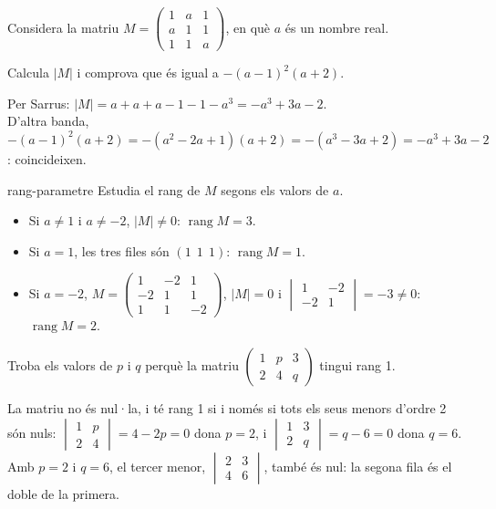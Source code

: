 Considera la matriu $M=\begin{pmatrix}1&a&1\\a&1&1\\1&1&a\end{pmatrix}$, en què $a$ és un nombre real.

\begin{apartats}

Calcula $|M|$ i comprova que és igual a $-(a-1)^2(a+2)$.

\begin{solucio}
Per Sarrus: $|M|=a+a+a-1-1-a^3=-a^3+3a-2$.\\
D'altra banda, $-(a-1)^2(a+2)=-(a^2-2a+1)(a+2)=-(a^3-3a+2)=-a^3+3a-2$: coincideixen.
\end{solucio}

\begin{tria}{rang-parametre}
Estudia el rang de $M$ segons els valors de $a$.

\begin{solucio}
\begin{itemize}
\item Si $a\ne1$ i $a\ne-2$, $|M|\ne0$: $\operatorname{rang}M=3$.
\item Si $a=1$, les tres files són $(1\ \ 1\ \ 1)$: $\operatorname{rang}M=1$.
\item Si $a=-2$, $M=\begin{pmatrix}1&-2&1\\-2&1&1\\1&1&-2\end{pmatrix}$, $|M|=0$ i
$\begin{vmatrix}1&-2\\-2&1\end{vmatrix}=-3\ne0$: $\operatorname{rang}M=2$.
\end{itemize}
\end{solucio}

Troba els valors de $p$ i $q$ perquè la matriu $\begin{pmatrix}1&p&3\\2&4&q\end{pmatrix}$ tingui rang 1.

\begin{solucio}
La matriu no és nul·la, i té rang 1 si i només si tots els seus menors d'ordre 2 són nuls:
$\begin{vmatrix}1&p\\2&4\end{vmatrix}=4-2p=0$ dona $p=2$, i $\begin{vmatrix}1&3\\2&q\end{vmatrix}=q-6=0$
dona $q=6$. Amb $p=2$ i $q=6$, el tercer menor, $\begin{vmatrix}2&3\\4&6\end{vmatrix}$, també és nul: la
segona fila és el doble de la primera.
\end{solucio}
\end{tria}


\end{apartats}
